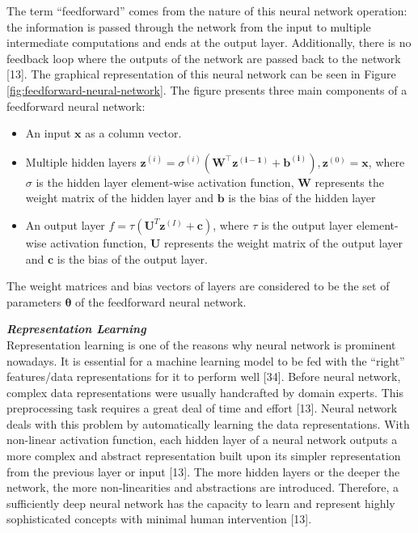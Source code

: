 \documentclass[
]{article}
\providecommand{\tightlist}{%
  \setlength{\itemsep}{0pt}\setlength{\parskip}{0pt}}
\begin{document}
The term ``feedforward'' comes from the nature of this neural network operation: the information is passed through the network from the input to multiple intermediate computations and ends at the output layer. Additionally, there is no feedback loop where the outputs of the network are passed back to the network {[}13{]}. The graphical representation of this neural network can be seen in Figure \ref{fig:feedforward-neural-network}. The figure presents three main components of a feedforward neural network:
\vspace{-0.4cm}

\begin{itemize}
\tightlist
\item
  An input \(\mathbf{x}\) as a column vector.
\item
  Multiple hidden layers \(\mathbf{z}^{(i)} = \sigma^{(i)} (\mathbf{W^\intercal z^{(i - 1)}} + \mathbf{b^{(i)}}), \mathbf{z}^{(0)} = \mathbf{x}\), where \(\sigma\) is the hidden layer element-wise activation function, \(\mathbf{W}\) represents the weight matrix of the hidden layer and \(\mathbf{b}\) is the bias of the hidden layer
\item
  An output layer \(f = \tau (\mathbf{U}^{T}\mathbf{z}^{(I)} + \mathbf{c})\), where \(\tau\) is the output layer element-wise activation function, \(\mathbf{U}\) represents the weight matrix of the output layer and \(\mathbf{c}\) is the bias of the output layer.
  \vspace{-0.5cm}
\end{itemize}

The weight matrices and bias vectors of layers are considered to be the set of parameters \(\boldsymbol\theta\) of the feedforward neural network.

\textbf{\emph{Representation Learning}}\\
Representation learning is one of the reasons why neural network is prominent nowadays. It is essential for a machine learning model to be fed with the ``right'' features/data representations for it to perform well {[}34{]}. Before neural network, complex data representations were usually handcrafted by domain experts. This preprocessing task requires a great deal of time and effort {[}13{]}. Neural network deals with this problem by automatically learning the data representations. With non-linear activation function, each hidden layer of a neural network outputs a more complex and abstract representation built upon its simpler representation from the previous layer or input {[}13{]}. The more hidden layers or the deeper the network, the more non-linearities and abstractions are introduced. Therefore, a sufficiently deep neural network has the capacity to learn and represent highly sophisticated concepts with minimal human intervention {[}13{]}.
\end{document}
